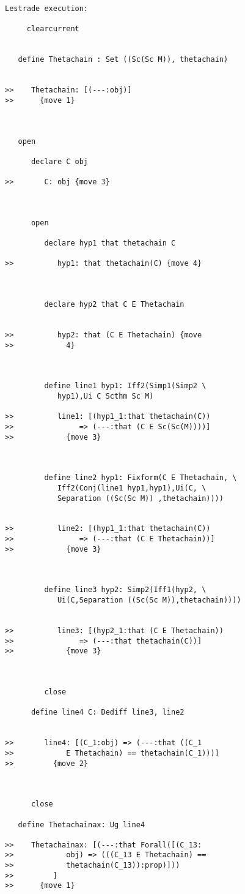 \documentclass[12pt]{article}
\begin{document}
\begin{verbatim}Lestrade execution:

     clearcurrent


   define Thetachain : Set ((Sc(Sc M)), thetachain)


>>    Thetachain: [(---:obj)]
>>      {move 1}



   open

      declare C obj

>>       C: obj {move 3}



      open

         declare hyp1 that thetachain C

>>          hyp1: that thetachain(C) {move 4}



         declare hyp2 that C E Thetachain


>>          hyp2: that (C E Thetachain) {move
>>            4}



         define line1 hyp1: Iff2(Simp1(Simp2 \
            hyp1),Ui C Scthm Sc M)

>>          line1: [(hyp1_1:that thetachain(C))
>>               => (---:that (C E Sc(Sc(M))))]
>>            {move 3}



         define line2 hyp1: Fixform(C E Thetachain, \
            Iff2(Conj(line1 hyp1,hyp1),Ui(C, \
            Separation ((Sc(Sc M)) ,thetachain))))


>>          line2: [(hyp1_1:that thetachain(C))
>>               => (---:that (C E Thetachain))]
>>            {move 3}



         define line3 hyp2: Simp2(Iff1(hyp2, \
            Ui(C,Separation ((Sc(Sc M)),thetachain))))


>>          line3: [(hyp2_1:that (C E Thetachain))
>>               => (---:that thetachain(C))]
>>            {move 3}



         close

      define line4 C: Dediff line3, line2


>>       line4: [(C_1:obj) => (---:that ((C_1
>>            E Thetachain) == thetachain(C_1)))]
>>         {move 2}



      close

   define Thetachainax: Ug line4

>>    Thetachainax: [(---:that Forall([(C_13:
>>            obj) => (((C_13 E Thetachain) ==
>>            thetachain(C_13)):prop)]))
>>         ]
>>      {move 1}


\end{verbatim}
\end{document}
